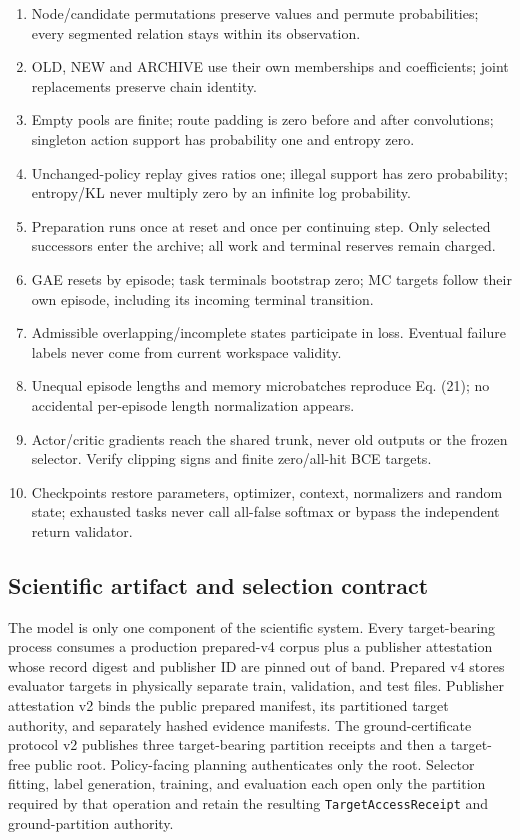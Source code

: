 \documentclass[10pt,a4paper]{article}
\providecommand{\tightlist}{\setlength{\itemsep}{1pt}\setlength{\parskip}{0pt}}
\begin{document}
\begin{enumerate}
\def\labelenumi{\arabic{enumi}.}
\tightlist
\item
  Node/candidate permutations preserve values and permute probabilities;
  every segmented relation stays within its observation.
\item
  OLD, NEW and ARCHIVE use their own memberships and coefficients; joint
  replacements preserve chain identity.
\item
  Empty pools are finite; route padding is zero before and after
  convolutions; singleton action support has probability one and entropy
  zero.
\item
  Unchanged-policy replay gives ratios one; illegal support has zero
  probability; entropy/KL never multiply zero by an infinite log
  probability.
\item
  Preparation runs once at reset and once per continuing step. Only
  selected successors enter the archive; all work and terminal reserves
  remain charged.
\item
  GAE resets by episode; task terminals bootstrap zero; MC targets
  follow their own episode, including its incoming terminal transition.
\item
  Admissible overlapping/incomplete states participate in loss. Eventual
  failure labels never come from current workspace validity.
\item
  Unequal episode lengths and memory microbatches reproduce Eq. (21); no
  accidental per-episode length normalization appears.
\item
  Actor/critic gradients reach the shared trunk, never old outputs or
  the frozen selector. Verify clipping signs and finite zero/all-hit BCE
  targets.
\item
  Checkpoints restore parameters, optimizer, context, normalizers and
  random state; exhausted tasks never call all-false softmax or bypass
  the independent return validator.
\end{enumerate}

\hypertarget{scientific-artifact-and-selection-contract}{%
\subsection{Scientific artifact and selection
contract}\label{scientific-artifact-and-selection-contract}}

The model is only one component of the scientific system. Every
target-bearing process consumes a production prepared-v4 corpus plus a
publisher attestation whose record digest and publisher ID are pinned
out of band. Prepared v4 stores evaluator targets in physically
separate train, validation, and test files. Publisher attestation v2
binds the public prepared manifest, its partitioned target authority,
and separately hashed evidence manifests. The ground-certificate
protocol v2 publishes three target-bearing partition receipts and then
a target-free public root. Policy-facing planning authenticates only the
root. Selector fitting, label generation, training, and evaluation each
open only the partition required by that operation and retain the
resulting \texttt{TargetAccessReceipt} and ground-partition authority.
\end{document}
